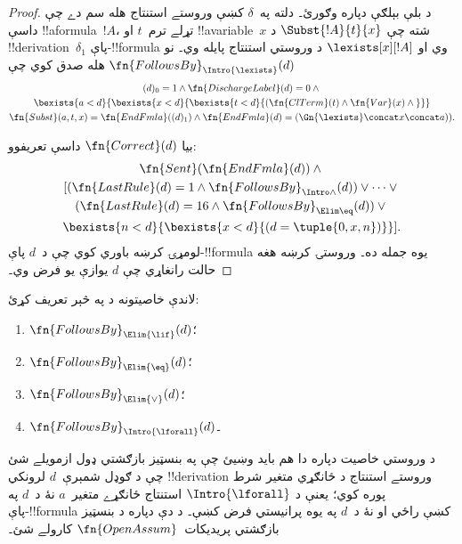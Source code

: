 \documentclass[../../../include/open-logic-section]{subfiles}
\begin{document}
\begin{proof}
  د بلې بېلګې دپاره \Intro{\lexists} وګورئ۔ دلته په~$\delta$ کښې
  وروستے استنتاج هله سم دے چې داسې !!a{formula}~$!A$، تړلے ترم~$t$
  او !!a{variable}~$x$ شته چې $\Subst{!A}{t}{x}$ د
  !!{derivation}~$\delta_1$ پاې-!!{formula} وي او
  $\lexists[x][!A]$ د وروستي استنتاج پايله وي۔ نو
  $\fn{FollowsBy}_{\Intro{\lexists}}(d)$ هله صدق کوي چې
  \begin{multline*}
    (d)_0 = 1 \land \fn{DischargeLabel}(d) = 0 \land {} \\
    \bexists{a < d}{\bexists{x<d}{\bexists{t<d}{
          (\fn{ClTerm}(t) \land \fn{Var}(x)  \land {}}}}\\
    \fn{Subst}(a,t,x) = \fn{EndFmla}((d)_1) \land
    \fn{EndFmla}(d) = (\Gn{\lexists} \concat x \concat a)).
  \end{multline*}

  بيا $\fn{Correct}(d)$ داسې تعريفوو:
  \begin{multline*}
    \fn{Sent}(\fn{EndFmla}(d)) \land {}\\
    [(\fn{LastRule}(d) = 1 \land
    \fn{FollowsBy}_{\Intro\land}(d)) \lor \dots \lor {}\\
    (\fn{LastRule}(d) = 16 \land \fn{FollowsBy}_{\Elim\eq}(d)) \lor {}\\
    \bexists{n<d}{\bexists{x<d}{(d = \tuple{0, x, n})}}].
  \end{multline*}
  لومړۍ کرښه باوري کوي چې د~$d$ پاې-!!{formula} يوه جمله ده۔ وروستۍ
  کرښه هغه حالت رانغاړي چې $d$ يوازې يو فرض وي۔
\end{proof}

\begin{prob}
  لاندې خاصيتونه د  په څېر
  تعريف کړئ:
  \begin{enumerate}
  \item $\fn{FollowsBy}_{\Elim{\lif}}(d)$؛
  \item $\fn{FollowsBy}_{\Elim{\eq}}(d)$؛
  \item $\fn{FollowsBy}_{\Elim{\lor}}(d)$؛
  \item $\fn{FollowsBy}_{\Intro{\lforall}}(d)$۔
  \end{enumerate}
  د وروستي خاصيت دپاره دا هم بايد وښيئ چې په بنسټيز بازګشتي ډول
  ازمويلے شئ چې د ګوډل شمېرې~$d$ لرونکي !!{derivation} وروستے
  استنتاج د ځانګړي متغير شرط پوره کوي؛ يعنې د
  $\Intro{\lforall}$ استنتاج ځانګړے متغير~$a$ نۀ د~$d$ په
  پاې-!!{formula} کښې راځي او نۀ د~$d$ په يوه پرانيستي فرض کښې۔ د
  دې دپاره د  بنسټيز بازګشتي
  پريديکات~$\fn{OpenAssum}$ کارولے شئ۔
\end{prob}
\end{document}
